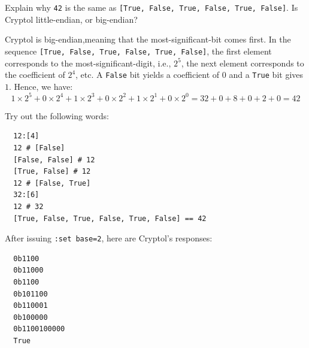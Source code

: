 \begin{Exercise}\label{ex:words:0}
  Explain why {\tt 42} is the same as {\tt [True, False, True, False,
    True, False]}.  Is Cryptol little-endian, or
  big-endian?\indEndianness
\end{Exercise}
\begin{Answer}
  Cryptol is big-endian,\indEndianness meaning that the
  most-significant-bit comes first. In the sequence {\tt [True, False,
    True, False, True, False]}, the first element corresponds to the
  most-significant-digit, i.e., $2^5$, the next element corresponds to
  the coefficient of $2^4$, etc.  A {\tt False} bit yields a
  coefficient of $0$ and a {\tt True} bit gives $1$. Hence, we have:
$$1\times2^5 + 0\times2^4 + 1\times2^3 + 0\times2^2 + 1\times2^1 + 0\times2^0 = 32 + 0 + 8 + 0 + 2 + 0 = 42$$
\end{Answer}

\begin{Exercise}\label{ex:words:1}
  Try out the following words: \indSettingBase
\begin{Verbatim}
  12:[4]
  12 # [False]
  [False, False] # 12
  [True, False] # 12
  12 # [False, True]
  32:[6]
  12 # 32
  [True, False, True, False, True, False] == 42
\end{Verbatim}
\end{Exercise}
\begin{Answer}
  After issuing {\tt :set base=2}, here are Cryptol's
  responses:\indSettingBase
\begin{Verbatim}
  0b1100
  0b11000
  0b1100
  0b101100
  0b110001
  0b100000
  0b1100100000
  True
\end{Verbatim}
\end{Answer}

